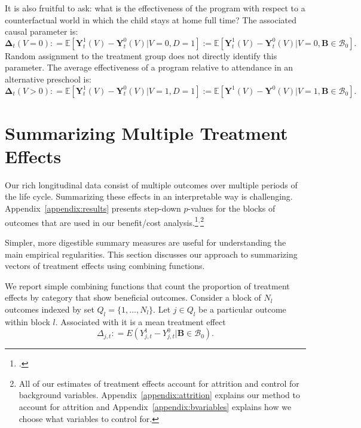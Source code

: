 It is also fruitful to ask: what is the effectiveness of the program with respect to a counterfactual world in which the child stays at home full time? The associated causal parameter is:
\begin{equation}\label{eq:influenza}
\bm{\Delta}_t \left(V = 0 \right) : =   \mathbb{E} \left[ \bm{Y}^1_t \left( V \right) - \bm{Y}^0_t \left( V \right) | V = 0, D = 1 \right] := \mathbb{E} \left[\bm{Y}^1_t (V) - \bm{Y}^0_t (V) | V = 0, \bm{B} \in \mathcal{B}_0 \right].
\end{equation}
Random assignment to the treatment group does not directly identify this parameter. The average effectiveness of a program relative to attendance in an alternative preschool is:
\begin{equation}\label{eq:smallpox}
\bm{\Delta}_t \left( V > 0 \right) : =   \mathbb{E} \left[ \bm{Y}^1_t \left(V \right) - \bm{Y}^0_t \left( V \right) | V = 1, D = 1 \right] := \mathbb{E} \left[\bm{Y}^1 (V) - \bm{Y}^0 (V) | V = 1, \bm{B} \in \mathcal{B}_0 \right].
\end{equation}

\section{Summarizing Multiple Treatment Effects} \label{section:methodology}

Our rich longitudinal data consist of multiple outcomes over multiple periods of the life cycle. Summarizing these effects in an interpretable way is challenging. Appendix~\ref{appendix:results} presents step-down $p$-values for the blocks of outcomes that are used in our benefit/cost analysis.\footnote{\citet{Lehman_Romano_2005_AnnStat,Romano_Shaikh_2006_AnnStat}.}$^,$\footnote{All of our estimates of treatment effects account for attrition and control for background variables. Appendix~\ref{appendix:attrition} explains our method to account for attrition and Appendix~\ref{appendix:bvariables} explains how we choose what variables to control for.}

Simpler, more digestible summary measures are useful for understanding the main empirical regularities. This section discusses our approach to summarizing vectors of treatment effects using combining functions.

We report simple combining functions that count the proportion of treatment effects by category that show beneficial outcomes. Consider a block of $N_l$ outcomes indexed by set $Q_l = \{1,\dots,N_l\}$. Let $j \in Q_l$ be a particular outcome within block $l$. Associated with it is a mean treatment effect
\begin{equation}
\Delta_{j,t} : = E(Y^1_{j,t} - Y^0_{j,t} | \bm{B} \in \mathcal{B}_0).
\end{equation}


